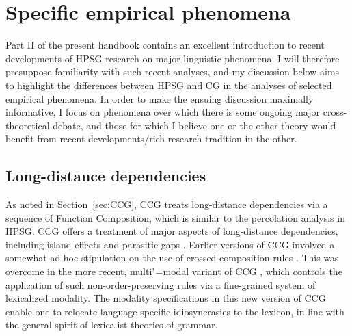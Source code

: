 \documentclass[output=paper,biblatex,babelshorthands,newtxmath,draftmode,colorlinks,citecolor=brown]{langscibook}
\begin{document}
\section{Specific empirical phenomena \label{phenomena}}

Part II of the present handbook contains an excellent introduction to
recent developments of HPSG research on major linguistic phenomena. I
will therefore presuppose familiarity with such recent analyses, and my discussion below aims to highlight the
differences between HPSG and CG in the analyses of selected
empirical phenomena. In order to make the ensuing discussion maximally
informative, I focus on phenomena over which there is some ongoing
major cross-theoretical debate, and those for which I believe one or
the other theory would benefit from recent developments/rich research
tradition in the other.


\subsection{Long-distance dependencies}

\enlargethispage{-6pt}
As noted in Section~\ref{sec:CCG}, CCG treats long-distance
dependencies via a sequence of Function Composition, which is similar
to the \slasch percolation analysis in HPSG. CCG offers a treatment of
major aspects of long-distance dependencies, including island effects
\citep[Section~4.2]{Steedman2000a-u} and parasitic gaps \citep{Steedman87a-u}.
Earlier versions of CCG involved a somewhat ad-hoc stipulation on the
use of crossed composition rules \citep{Steedman97a}. This was
overcome in the more recent, multi"=modal variant of CCG
\citep{Baldridge2002a-u}, which controls the application of such
non-order-preserving rules via a fine-grained system of
lexicalized modality. The modality specifications in this new version of CCG
enable one to relocate language-specific idiosyncrasies to the
lexicon, in line with the general spirit of lexicalist theories of
grammar.
\end{document}
